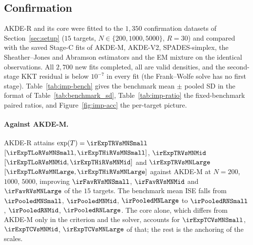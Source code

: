\subsection{Confirmation}

AKDE-R and its core were fitted to the $1{,}350$ confirmation datasets of
Section~\ref{sec:setup} ($15$ targets, $N\in\{200,1000,5000\}$, $R=30$) and
compared with the saved Stage-C fits of AKDE-M, AKDE-V2, SPADES-simplex, the
Sheather--Jones and Abramson estimators and the EM mixture on the identical
observations. All $2{,}700$ new fits completed, all are valid densities, and
the second-stage KKT residual is below $10^{-7}$ in every fit (the
Frank--Wolfe solve has no first stage). Table~\ref{tab:imp-bench} gives the
benchmark mean $\pm$ pooled SD in the format of Table~\ref{tab:benchmark_sd},
Table~\ref{tab:imp-ratio} the fixed-benchmark paired ratios, and
Figure~\ref{fig:imp-acc} the per-target picture.

\begin{table}[htbp]
\centering
\caption{Integrated squared error across the fixed benchmark, arithmetic mean
$\pm$ pooled sample SD over the $450$ fits per method and sample size (the
format of Table~\ref{tab:benchmark_sd}; the comparator rows are the same
fits). The SD includes between-target and between-dataset variation and is
not a confidence interval.}
\label{tab:imp-bench}
\small

\end{table}

\begin{table}[htbp]
\centering
\caption{Fixed-benchmark paired geometric-mean ISE ratio $\exp(T)$ of the
repaired estimator against each reference, with $95\%$ bootstrap intervals
from within-target resampling ($B=10{,}000$) and, in parentheses, the number
of the $15$ targets on which the repaired estimator is better. Values below
one favour the repaired estimator. Bootstrap intervals, not replicate SDs.}
\label{tab:imp-ratio}
\scriptsize

\end{table}

\paragraph{Against AKDE-M.} AKDE-R attains $\exp(T) = \irExpTRVsMNSmall$
$[\irExpTLoRVsMNSmall, \irExpTHiRVsMNSmall]$, $\irExpTRVsMNMid$
$[\irExpTLoRVsMNMid, \irExpTHiRVsMNMid]$ and $\irExpTRVsMNLarge$
$[\irExpTLoRVsMNLarge, \irExpTHiRVsMNLarge]$ against AKDE-M at
$N=200$, $1000$, $5000$, improving $\irFavRVsMNSmall$, $\irFavRVsMNMid$
and $\irFavRVsMNLarge$ of the $15$ targets. The benchmark mean ISE falls
from $\irPooledMNSmall$, $\irPooledMNMid$, $\irPooledMNLarge$ to
$\irPooledRNSmall$, $\irPooledRNMid$, $\irPooledRNLarge$. The core
alone, which differs from AKDE-M only in the criterion and the solver,
accounts for $\irExpTCVsMNSmall$, $\irExpTCVsMNMid$, $\irExpTCVsMNLarge$
of that; the rest is the anchoring of the scales.

